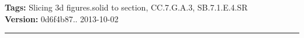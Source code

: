 \documentclass[twocolumn,10pt]{article}
\begin{document}
\medskip
\noindent
\textbf{Tags:} {\footnotesize Slicing 3d figures.solid to section, CC.7.G.A.3, SB.7.1.E.4.SR}\\
\textbf{Version:} 0d6f4b87.. 2013-10-02
\smallskip\hrule



\end{document}
